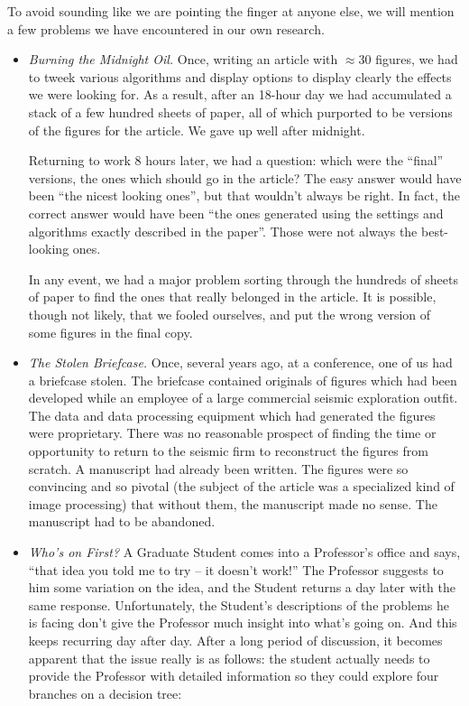To avoid sounding like we are pointing the
finger at anyone else, we will mention a few problems
we have encountered in our own research.

\begin{itemize}
\item {\it Burning the Midnight Oil.} Once, writing an article with $\approx 30$ figures,
we had to tweek various algorithms and display options
to display clearly the effects we were looking for.
As a result, after an 18-hour day we had 
accumulated a stack of a few hundred sheets of paper, all of which
purported to be versions of the figures for the article.  We gave
up well after midnight.  

Returning to work 8 hours later, we had a question:  
which were the ``final'' versions, the ones which should go in the article?
The easy answer would have been ``the nicest looking ones'', but that wouldn't always
be right.  In fact, the correct answer would have been ``the ones
generated using the settings and algorithms exactly described in the
paper''.  Those were not always the best-looking ones.

In any event, we had a major problem sorting through the hundreds of sheets
of paper to find the ones that really belonged in the article.  It is possible,
though not likely, that we fooled ourselves, and put the wrong version of some
figures in the final copy.  

\item {\it The Stolen Briefcase.} 
Once, several years ago, at a conference, one of us had a briefcase stolen.  The
briefcase contained originals of figures which had been developed while an employee of a
large commercial seismic exploration outfit. 
The data and data processing equipment which had
generated the figures were proprietary. 
There was no reasonable prospect of finding the time
or opportunity to return to the seismic firm to reconstruct the figures from scratch.  A
manuscript had already been written.  The figures were so convincing and so pivotal (the
subject of the article was a specialized kind of image processing) that without them, the
manuscript made no sense.  The manuscript had to be abandoned.   

\item {\it Who's on First?} A Graduate Student comes into a Professor's office and says,
``that idea you told me to try -- it doesn't work!''  The Professor suggests to him some
variation on the idea, and the Student returns a day later with the same response. 
Unfortunately, the Student's descriptions of the problems he is facing don't give the
Professor much insight into what's going on. And this keeps recurring day after day. After
a long period of discussion, it becomes apparent that the issue really is as follows: the
student actually needs to provide the Professor with detailed information so they could
explore four branches on a decision tree:


\end{itemize}
